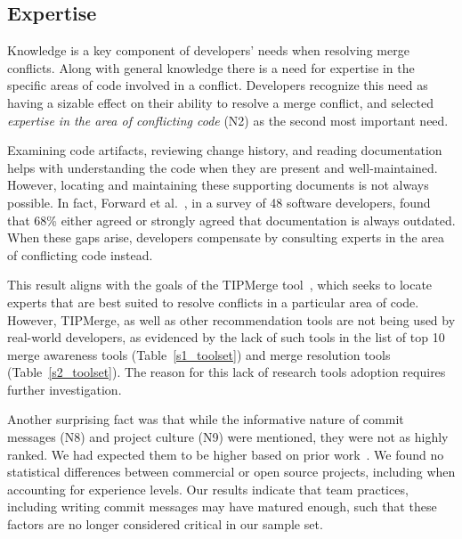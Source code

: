 \subsection{Expertise}
Knowledge is a key component of developers' needs when resolving merge conflicts.
Along with general knowledge there is a need for expertise in the specific areas of code involved in a conflict.
Developers recognize this need as having a sizable effect on their ability to resolve a merge conflict, and selected \textit{expertise in the area of conflicting code} (N2) as the second most important need.

Examining code artifacts, reviewing change history, and reading documentation helps with understanding the code when they are present and well-maintained.
However, locating and maintaining these supporting documents is not always possible.
In fact, Forward et al.~\cite{forward2002documentation}, in a survey of 48 software developers, found that 68\% either agreed or strongly agreed that documentation is always outdated.
When these gaps arise, developers compensate by consulting experts in the area of conflicting code instead.

This result aligns with the goals of the TIPMerge tool~\cite{CostaSarma}, which seeks to locate experts that are best suited to resolve conflicts in a particular area of code.
However, TIPMerge, as well as other recommendation tools are not being used by real-world developers, as evidenced by the lack of such tools in the list of top 10 merge awareness tools (Table~\ref{s1_toolset}) and merge resolution tools (Table~\ref{s2_toolset}).
The reason for this lack of research tools adoption requires further investigation.

Another surprising fact was that while the informative nature of commit messages (N8) and project culture (N9) were mentioned, they were not as highly ranked. %
We had expected them to be higher based on prior work~\cite{yamauchi2014clustering, hindle2009automatic, cortes2014automatically, hattori2008nature}. 
We found no statistical differences between commercial or open source projects, including when accounting for experience levels.
Our results indicate that team practices, including writing commit messages may have matured enough, such that these factors are no longer considered critical in our sample set. 


